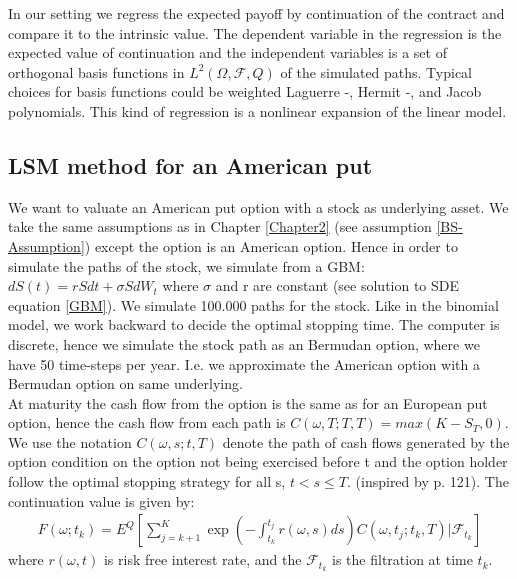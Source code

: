 In our setting we regress the expected payoff by continuation of the contract and compare it to the intrinsic value. The dependent variable in the regression is the expected value of continuation and the independent variables is a set of orthogonal basis functions in $L^2(\Omega, \mathcal{F}, Q)$ of the simulated paths. Typical choices for basis functions could be weighted Laguerre -, Hermit -, and Jacob polynomials. This kind of regression is a nonlinear expansion of the linear model. 

\subsection{LSM method for an American put}           
We want to valuate an American put option with a stock as underlying asset. We take the same assumptions as in Chapter \ref{Chapter2} (see assumption \ref{BS-Assumption}) except the option is an American option. Hence in order to simulate the paths of the stock, we simulate from a GBM: $dS(t)=rSdt + \sigma S dW_t$ where $\sigma$ and r are constant (see solution to SDE equation \ref{GBM}). We simulate 100.000 paths for the stock. Like in the binomial model, we work backward to decide the optimal stopping time. The computer is discrete, hence we simulate the stock path as an Bermudan option, where we have 50 time-steps per year. I.e. we approximate the American option with a Bermudan option on same underlying. \\

At maturity the cash flow from the option is the same as for an European put option, hence the cash flow from each path is $C(\omega,T;T, T)=max(K-S_T,0)$. We use the notation $C(\omega, s; t, T)$ denote the path of cash flows generated by the option condition on the option not being exercised before t and the option holder follow the optimal stopping strategy for all s, $t<s\leq T$.
(inspired by \parencite{lsm} p. 121). The continuation value is given by:
\begin{equation}\label{continuation-value}
\begin{split}
F(\omega; t_k)=E^Q[\sum_{j=k+1}^K \exp(-\int_{t_k}^{t_j} r(\omega,s) ds)C(\omega,t_j; t_k, T)|\mathcal{F}_{t_k}]
\end{split}
\end{equation}
where $r(\omega,t)$ is risk free interest rate, and the $\mathcal{F}_{t_k}$ is the filtration at time $t_k$.\\

